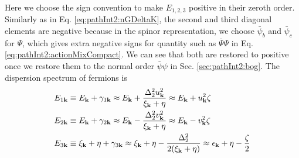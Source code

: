 Here we choose the sign convention to make  $E_{1,2,3}$  positive in their zeroth order.  Similarly as in Eq.  \ref{eq:pathInt2:nGDeltaK}, the second and third diagonal elements are negative because in the spinor representation, we choose $\bar{\psi}_{b}$ and $\bar{\psi}_{c}$ for $\Psi$, which gives extra negative signs for quantity such as $\bar\Psi\Psi$ in Eq. \ref{eq:pathInt2:actionMixCompact}.  We can see that both are restored to positive once we restore them to the normal order $\bar\psi\psi$ in Sec. \ref{sec:pathInt2:bog}.  %
The dispersion spectrum of fermions is
\begin{align}\label{eq:pathInt2:xiExpand}
E_{1\mathbf{k}}&\equiv{}E_{\mathbf{k}}+\gamma_{1\mathbf{k}}\approx{}E_{\mathbf{k}}+\frac{\Delta_{2}^{2}u_{\mathbf{k}}^{2}}{\xi_{\mathbf{k}}+\eta}
\approx{}E_{\mathbf{k}}+u_{\mathbf{k}}^{2}\zeta\\
E_{2\mathbf{k}}&\equiv{}E_{\mathbf{k}}+\gamma_{2\mathbf{k}}\approx{}E_{\mathbf{k}}-\frac{\Delta_{2}^{2}v_{\mathbf{k}}^{2}}{\xi_{\mathbf{k}}+\eta}
\approx{}E_{\mathbf{k}}-v_{\mathbf{k}}^{2}\zeta\label{eq:pathInt2:xiExpand2}\\
E_{3\mathbf{k}}&\equiv{}\xi_{\mathbf{k}}+\eta+\gamma_{3\mathbf{k}}\approx{}\xi_{\mathbf{k}}+\eta-\frac{\Delta_{2}^{2}}{2(\xi_{\mathbf{k}}+\eta)}
\approx{}\epsilon_{\mathbf{k}}+\eta-\frac{\zeta}{2}
\label{eq:pathInt2:xiExpand3}
\end{align}


